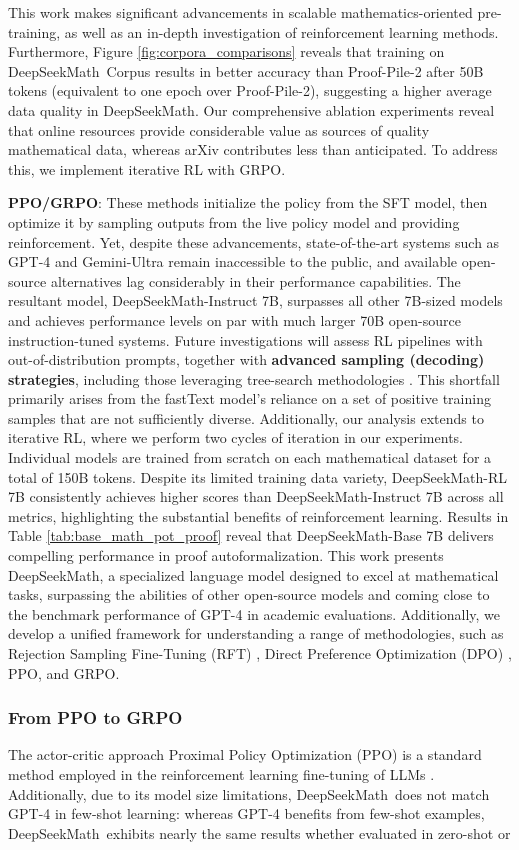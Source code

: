 This work makes significant advancements in scalable mathematics-oriented pre-training, as well as an in-depth investigation of reinforcement learning methods. Furthermore, Figure \ref{fig:corpora_comparisons} reveals that training on DeepSeekMath~Corpus results in better accuracy than Proof-Pile-2 after 50B tokens (equivalent to one epoch over Proof-Pile-2), suggesting a higher average data quality in DeepSeekMath. Our comprehensive ablation experiments reveal that online resources provide considerable value as sources of quality mathematical data, whereas arXiv contributes less than anticipated. To address this, we implement iterative RL with GRPO. \item \textbf{PPO/GRPO}: These methods initialize the policy from the SFT model, then optimize it by sampling outputs from the live policy model and providing reinforcement. Yet, despite these advancements, state-of-the-art systems such as GPT-4 \citep{gpt4} and Gemini-Ultra \citep{gemini} remain inaccessible to the public, and available open-source alternatives lag considerably in their performance capabilities. The resultant model, DeepSeekMath-Instruct 7B, surpasses all other 7B-sized models and achieves performance levels on par with much larger 70B open-source instruction-tuned systems. Future investigations will assess RL pipelines with out-of-distribution prompts, together with \textbf{advanced sampling (decoding) strategies}, including those leveraging tree-search methodologies \citep{yao2023tree}. This shortfall primarily arises from the fastText model's reliance on a set of positive training samples that are not sufficiently diverse. Additionally, our analysis extends to iterative RL, where we perform two cycles of iteration in our experiments. Individual models are trained from scratch on each mathematical dataset for a total of 150B tokens. Despite its limited training data variety, DeepSeekMath-RL 7B consistently achieves higher scores than DeepSeekMath-Instruct 7B across all metrics, highlighting the substantial benefits of reinforcement learning. Results in Table \ref{tab:base_math_pot_proof} reveal that DeepSeekMath-Base 7B delivers compelling performance in proof autoformalization. This work presents DeepSeekMath, a specialized language model designed to excel at mathematical tasks, surpassing the abilities of other open-source models and coming close to the benchmark performance of GPT-4 in academic evaluations. Additionally, we develop a unified framework for understanding a range of methodologies, such as Rejection Sampling Fine-Tuning (RFT) \citep{yuan2023scaling}, Direct Preference Optimization (DPO) \citep{dpo}, PPO, and GRPO. \subsubsection{From PPO to GRPO} The actor-critic approach Proximal Policy Optimization (PPO) \citep{schulman2017proximal} is a standard method employed in the reinforcement learning fine-tuning of LLMs \citep{ouyang2022training}. Additionally, due to its model size limitations, DeepSeekMath~does not match GPT-4 in few-shot learning: whereas GPT-4 benefits from few-shot examples, DeepSeekMath~exhibits nearly the same results whether evaluated in zero-shot or 